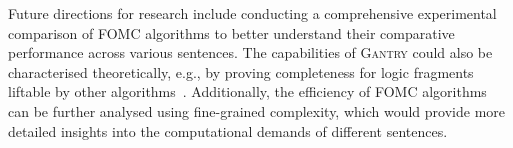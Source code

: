 \documentclass[a4paper,UKenglish,cleveref, autoref, thm-restate]{lipics-v2021}
\newcommand{\Cranetwo}{\textsc{Gantry}}
\begin{document}
Future directions for research include conducting a comprehensive experimental
comparison of FOMC algorithms to better understand their comparative performance
across various sentences. The capabilities of \Cranetwo{} could also be
characterised theoretically, e.g., by proving completeness for logic fragments
liftable by other
algorithms~\cite{DBLP:journals/jair/Kuzelka21,DBLP:conf/aaai/TothK23,DBLP:journals/ai/BremenK23}.
Additionally, the efficiency of FOMC algorithms can be further analysed using
fine-grained complexity, which would provide more detailed insights into the
computational demands of different sentences.


\end{document}
